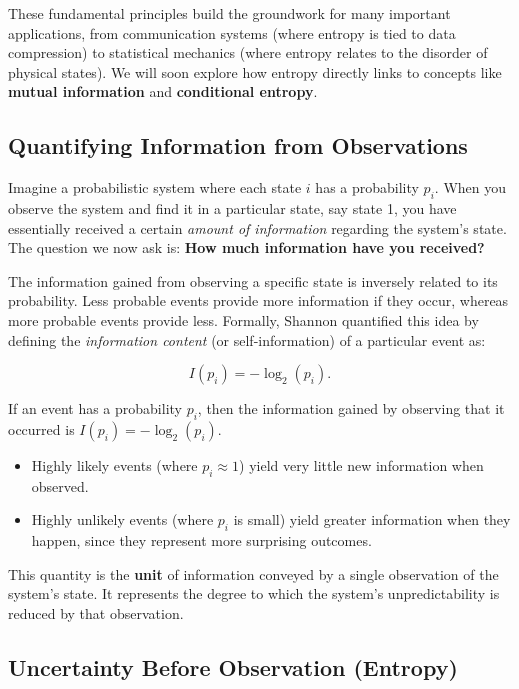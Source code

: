 \documentclass[12pt,a4paper]{article}
\newenvironment{rembox}[1][]{%
  \begin{tcolorbox}[enhanced, breakable, colback=gray!5, colframe=gray!50, title=#1, fonttitle=\bfseries, arc=3pt, boxrule=0.5pt]
}{\end{tcolorbox}}
\begin{document}
These fundamental principles build the groundwork for many important applications, from communication systems (where entropy is tied to data compression) to statistical mechanics (where entropy relates to the disorder of physical states). We will soon explore how entropy directly links to concepts like \textbf{mutual information} and \textbf{conditional entropy}.

\subsection{Quantifying Information from Observations}

Imagine a probabilistic system where each state $i$ has a probability $p_i$. When you observe the system and find it in a particular state, say state 1, you have essentially received a certain \emph{amount of information} regarding the system’s state. The question we now ask is: \textbf{How much information have you received?}

The information gained from observing a specific state is inversely related to its probability. Less probable events provide more information if they occur, whereas more probable events provide less. Formally, Shannon quantified this idea by defining the \emph{information content} (or self-information) of a particular event as:

\begin{equation}
I(p_i) = - \log_2(p_i).
\end{equation}

\begin{rembox}[Interpreting Self-information]
If an event has a probability $p_i$, then the information gained by observing that it occurred is $I(p_i) = - \log_2(p_i)$.
\begin{itemize}
    \item Highly likely events (where $p_i \approx 1$) yield very little new information when observed.
    \item Highly unlikely events (where $p_i$ is small) yield greater information when they happen, since they represent more surprising outcomes.
\end{itemize}
\end{rembox}

This quantity is the \textbf{unit} of information conveyed by a single observation of the system’s state. It represents the degree to which the system's unpredictability is reduced by that observation.

\subsection{Uncertainty Before Observation (Entropy)}
\end{document}
